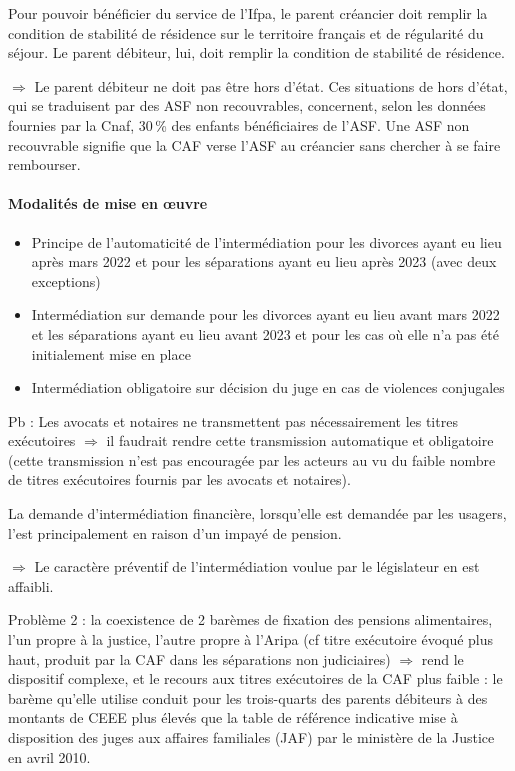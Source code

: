 \documentclass{article}
\begin{document}
\medskip
\noindent Pour pouvoir bénéficier du service de l'Ifpa, le parent créancier doit remplir la condition de stabilité de résidence sur le territoire français et de régularité du séjour. Le parent débiteur, lui, doit remplir la condition de stabilité de résidence.
 
\medskip
\noindent $\Rightarrow$ Le parent débiteur ne doit pas être hors d'état. Ces situations de hors d'état, qui se traduisent par des ASF non recouvrables, concernent, selon les données fournies par la Cnaf, 30\,\% des enfants bénéficiaires de l'ASF. Une ASF non recouvrable signifie que la CAF verse l'ASF au créancier sans chercher à se faire rembourser.
 
\paragraph{Modalités de mise en œuvre}
\begin{itemize}
    \item Principe de l'automaticité de l'intermédiation pour les divorces ayant eu lieu après mars 2022 et pour les séparations ayant eu lieu après 2023 (avec deux exceptions)
    \item Intermédiation sur demande pour les divorces ayant eu lieu avant mars 2022 et les séparations ayant eu lieu avant 2023 et pour les cas où elle n'a pas été initialement mise en place
    \item Intermédiation obligatoire sur décision du juge en cas de violences conjugales
\end{itemize}
 
\medskip
\noindent Pb : Les avocats et notaires ne transmettent pas nécessairement les titres exécutoires $\Rightarrow$ il faudrait rendre cette transmission automatique et obligatoire (cette transmission n'est pas encouragée par les acteurs au vu du faible nombre de titres exécutoires fournis par les avocats et notaires).
 
\medskip
\noindent La demande d'intermédiation financière, lorsqu'elle est demandée par les usagers, l'est principalement en raison d'un impayé de pension.
 
\medskip
\noindent $\Rightarrow$ Le caractère préventif de l'intermédiation voulue par le législateur en est affaibli.
 
\medskip
\noindent Problème 2 : la coexistence de 2 barèmes de fixation des pensions alimentaires, l'un propre à la justice, l'autre propre à l'Aripa (cf titre exécutoire évoqué plus haut, produit par la CAF dans les séparations non judiciaires) $\Rightarrow$ rend le dispositif complexe, et le recours aux titres exécutoires de la CAF plus faible : le barème qu'elle utilise conduit pour les trois-quarts des parents débiteurs à des montants de CEEE plus élevés que la table de référence indicative mise à disposition des juges aux affaires familiales (JAF) par le ministère de la Justice en avril 2010.
 
\end{document}
